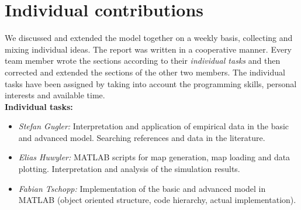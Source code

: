 \section{Individual contributions}
	We discussed and extended the model together on a weekly basis, collecting and mixing individual ideas. The report was written in a cooperative manner. Every team member wrote the sections according to their \textit{individual tasks} and then corrected and extended the sections of the other two members. The individual tasks have been assigned by taking into account the programming skills, personal interests and available time.\\
	
	\textbf{Individual tasks:}
	\begin{itemize}
		\item \textit{Stefan Gugler:} Interpretation and application of empirical data in the basic and advanced model. Searching references and data in the literature.
		\item \textit{Elias Huwyler:} MATLAB scripts for map generation, map loading and data plotting. Interpretation and analysis of the simulation results.
		\item \textit{Fabian Tschopp:} Implementation of the basic and advanced model in MATLAB (object oriented structure, code hierarchy, actual implementation).
	\end{itemize}